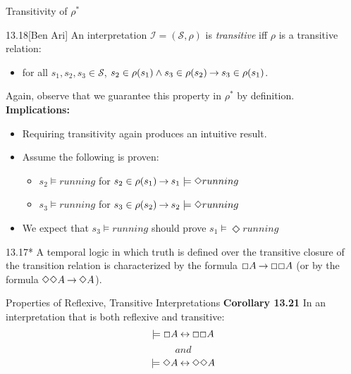 \begin{wideslide}[bm=,toc=]{Transitivity of $\rho^*$}
\begin{defn}{13.18}[Ben Ari]
An interpretation $\mathcal{I} = (\mathcal{S},\rho)$ is \emph{transitive}
iff $\rho$ is a transitive relation: 
\begin{itemize}
\item<2-> for all $s_1,s_2,s_3 \in \mathcal{S}$, 
$s_2 \in \rho(s_1) \land s_3 \in \rho(s_2) \mathbin{\rightarrow} s_3 \in \rho(s_1)$.
\end{itemize}
\end{defn}
\vspace{-3mm}
\pause[2]
Again, observe that we guarantee this property in $\rho^*$ by definition.\\[2mm]
\pause
{\bf Implications:}
\begin{itemize}
\item<5-> Requiring transitivity again produces an intuitive result.
\item<6-> Assume the following is proven:
\begin{itemize}
\item<7-> $s_2 \models running$ for $s_2 \in \rho(s_1) \mathbin{\rightarrow} s_1 \models \Diamond running$
\item<8-> $s_3 \models running$ for $s_3 \in \rho(s_2) \mathbin{\rightarrow} s_2 \models \Diamond running$
\end{itemize}
\item<9-> We expect that $s_3 \models running$ should prove $s_1 \models \Diamond running$ 
\end{itemize}
\pause[6]
\begin{thm}{13.17*}
A temporal logic in which truth is defined over the transitive closure of the transition 
relation is characterized by the formula $\Box A \mathbin{\rightarrow} \Box \Box A$ (or by the formula 
$\Diamond \Diamond A \mathbin{\rightarrow} \Diamond A$).
\end{thm}
\end{wideslide}
\begin{wideslide}[bm=,toc=]{Properties of Reflexive, Transitive Interpretations}
{\bf Corollary 13.21}
In an interpretation that is both reflexive and transitive:
\[
\models \Box A \mathbin{\leftrightarrow} \Box \Box A
\]
\[and\]
\[
\models \Diamond A \mathbin{\leftrightarrow} \Diamond \Diamond A
\]

\end{wideslide}

